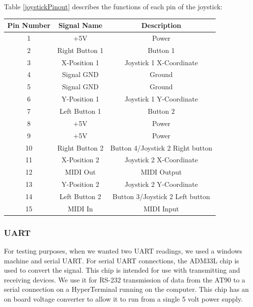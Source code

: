 Table \ref{joystickPinout} describes the functions of each pin of the
joystick:

\begin{minipage}{6.5in}
\begin{center}
\begin{tabular}{ c c c } 
  Pin Number & Signal Name & Description \\
  \hline
 1 & +5V & Power \\
 2 & Right Button 1 & Button 1 \\
 3 & X-Position 1 & Joystick 1 X-Coordinate \\
 4 & Signal GND & Ground \\
 5 & Signal GND & Ground \\
 6 & Y-Position 1 & Joystick 1 Y-Coordinate \\
 7 & Left Button 1 & Button 2 \\
 8 & +5V & Power \\
 9 & +5V & Power \\
 10 & Right Button 2 & Button 4/Joystick 2 Right button \\
 11 & X-Position 2 & Joystick 2 X-Coordinate \\
 12 & MIDI Out & MIDI Output \\
 13 & Y-Position 2 & Joystick 2 Y-Coordinate \\
 14 & Left Button 2 & Button 3/Joystick 2 Left button \\
 15 & MIDI In & MIDI Input \\
\end{tabular}
\label{joystickPinout}
\end{center}
\end{minipage}

\subsubsection{UART}
For testing purposes, when we wanted two UART readings, we used a windows machine and serial UART. For serial UART connections, the ADM33L chip is used to convert the signal. This chip is intended for use with transmitting and receiving devices. We use it for RS-232 transmission of data from the AT90 to a serial connection on a HyperTerminal running on the computer. This chip has an on board voltage converter to allow it to run from a single 5 volt power supply. 


